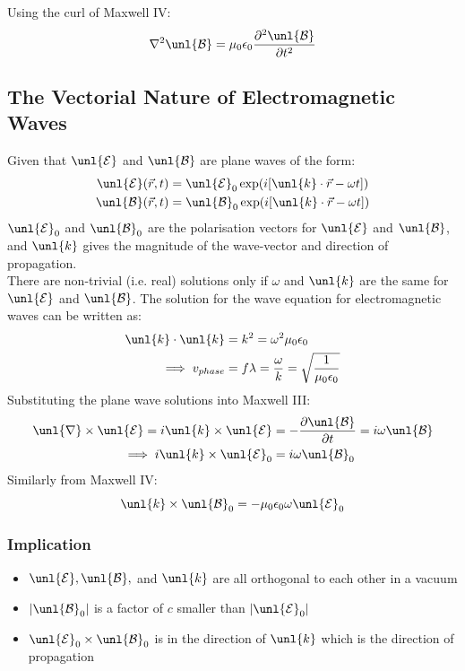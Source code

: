 \documentclass[a4paper, 11pt, normalem]{report}
\newcommand\p{\partial}
\newcommand\E{\mathcal{E}}
\newcommand\uE{\unl{\E}}
\newcommand\B{\mathcal{B}}
\newcommand\uB{\unl{\B}}
\newcommand\del{\unl{\nabla}}
\newcommand\eno{\epsilon_0}
\newcommand\vk{\unl{k}}
\newcommand\lam{\lambda}
\begin{document}
\chapter{}
Using the curl of Maxwell \RN{4}:
\begin{equation*}
    \nabla^2\uB = \mu_0\eno\frac{\p^2\uB}{\p t^2}
\end{equation*}

\section{The Vectorial Nature of Electromagnetic Waves}
Given that $\uE$ and $\uB$ are plane waves of the form:
\begin{align*}
    \uE(\vec{r},t) &= \uE_0\exp(i[\vk\cdot\vec{r}-\omega t]) \\
    \uB(\vec{r},t) &= \uB_0\exp(i[\vk\cdot\vec{r}-\omega t])
\end{align*}
$\uE_0$ and $\uB_0$ are the polarisation vectors for $\uE$ and $\uB$, and $\vk$ gives the magnitude of the wave-vector and direction of propagation. \\
There are non-trivial (i.e. real) solutions only if $\omega$ and $\vk$ are the same for $\uE$ and $\uB$.
The solution for the wave equation for electromagnetic waves can be written as:
\begin{align*}
    \vk\cdot\vk &= k^2 = \omega^2\mu_0\eno \\
    \implies v_{phase} &= f\lam = \frac{\omega}{k} = \sqrt{\frac{1}{\mu_0\eno}}
\end{align*}
Substituting the plane wave solutions into Maxwell \RN{3}:
\begin{align*}
    \del \times \uE = i\vk \times \uE &= -\frac{\p\uB}{\p t} = i\omega\uB \\
    \implies i\vk\times\uE_0 &= i\omega\uB_0
\end{align*}
Similarly from Maxwell \RN{4}:
\begin{equation*}
    \vk \times \uB_0 = -\mu_0\eno\omega\uE_0
\end{equation*}

\subsection{Implication}
\begin{itemize}
    \item $\uE, \uB,$ and $\vk$ are all orthogonal to each other in a vacuum
    \item $|\uB_0|$ is a factor of $c$ smaller than $|\uE_0|$
    \item $\uE_0\times\uB_0$ is in the direction of $\vk$ which is the direction of propagation
\end{itemize}
\end{document}
